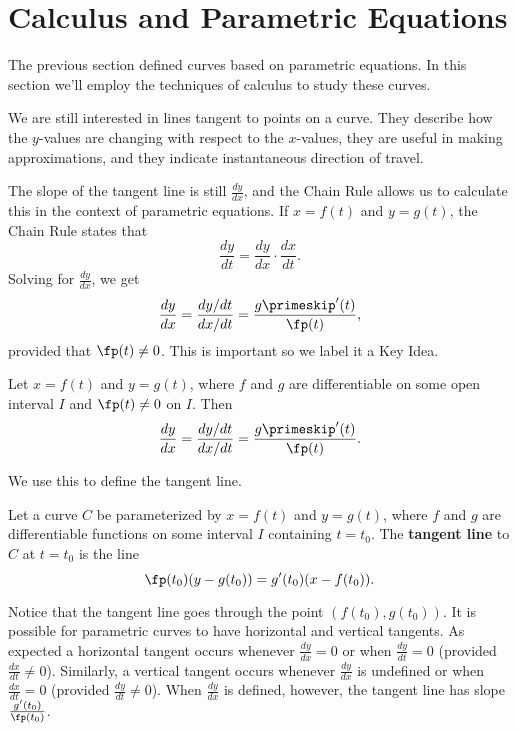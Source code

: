 \section{Calculus and Parametric Equations}\label{sec:par_calc}

The previous section defined curves based on parametric equations. In this section we'll employ the techniques of calculus to study these curves.

We are still interested in lines tangent to points on a curve. They describe how the $y$-values are changing with respect to the $x$-values, they are useful in making approximations, and they indicate instantaneous direction of travel.

The slope of the tangent line is still $\frac{dy}{dx}$, and the Chain Rule allows us to calculate this in the context of parametric equations. If $x=f(t)$ and $y=g(t)$, the Chain Rule states that
\[\frac{dy}{dt} = \frac{dy}{dx}\cdot\frac{dx}{dt}.\]
Solving for $\frac{dy}{dx}$, we get 
\[\frac{dy}{dx} = \frac{dy/dt}{dx/dt} = \frac{g\primeskip'(t)}{\fp(t)},\]
provided that $\fp(t)\neq 0$. This is important so we label it a Key Idea.

\begin{keyidea}\label{idea:dydxpar}
Let $x=f(t)$ and $y=g(t)$, where $f$ and $g$ are differentiable on some open interval $I$ and $\fp(t)\neq 0$ on $I$. Then 
\[
\frac{dy}{dx}=\frac{dy/dt}{dx/dt}=\frac{g\primeskip'(t)}{\fp(t)}.
\]
\end{keyidea}

We use this to define the tangent line.

\begin{definition}\label{def:tangent_par}
Let a curve $C$ be parameterized by $x=f(t)$ and $y=g(t)$, where $f$ and $g$ are differentiable functions on some interval $I$ containing $t=t_0$. The 
\textbf{tangent line} to $C$ at $t=t_0$ is the line
\[\fp(t_0)(y-g(t_0))=g'(t_0)(x-f(t_0)).\]
\end{definition}

Notice that the tangent line goes through the point $(f(t_0),g(t_0))$.  It is possible for parametric curves to have horizontal and vertical tangents. As expected a horizontal tangent occurs whenever $\frac{dy}{dx} = 0$ or when $\frac{dy}{dt} = 0$ (provided $\frac{dx}{dt} \neq 0$). Similarly, a vertical tangent occurs whenever $\frac{dy}{dx}$ is undefined or when $\frac{dx}{dt} = 0$ (provided $\frac{dy}{dt} \neq 0$).  When $\frac{dy}{dx}$ is defined, however, the tangent line has slope $\frac{g'(t_0)}{\fp(t_0)}$.

